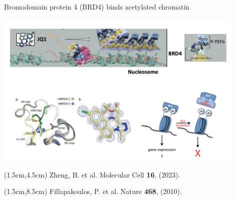 \documentclass{beamer}					%
\begin{document}
\begin{frame}{Bromodomain protein 4 (BRD4) binds acetylated chromatin}

\includegraphics[width=12cm]{media/Epigenetic}

\begin{textblock*}{10cm}(1.5cm,4.5cm)
Zheng, B. et al. Molecular Cell \textbf{16}, (2023).
\end{textblock*}

\begin{textblock*}{10cm}(1.5cm,8.5cm)
Fillapakoulos, P. et al. Nature \textbf{468}, (2010).
\end{textblock*}

\end{frame}
\end{document}

